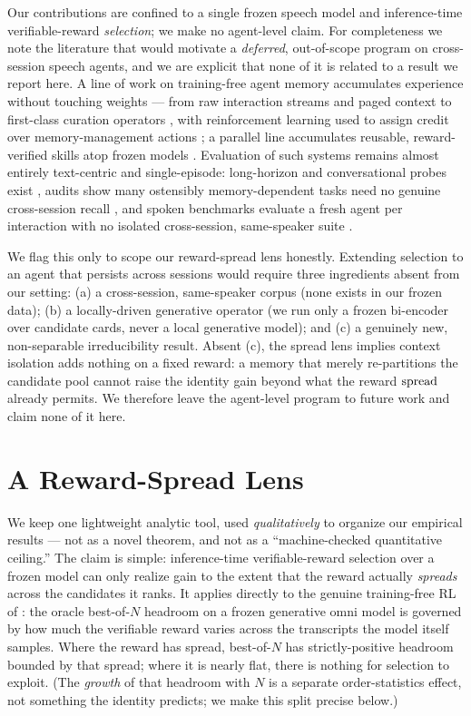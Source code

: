 Our contributions are confined to a single frozen speech model and inference-time verifiable-reward \emph{selection}; we make no agent-level claim. For completeness we note the literature that would motivate a \emph{deferred}, out-of-scope program on cross-session speech agents, and we are explicit that none of it is related to a result we report here. A line of work on training-free agent memory accumulates experience without touching weights --- from raw interaction streams and paged context \citep{genagents2023,memgpt2023} to first-class curation operators \citep{mem0_2025}, with reinforcement learning used to assign credit over memory-management actions \citep{memoryr1_2025}; a parallel line accumulates reusable, reward-verified skills atop frozen models \citep{voyager2023,sokskills2026}. Evaluation of such systems remains almost entirely text-centric and single-episode: long-horizon and conversational probes exist \citep{longmemeval2024,locomo2024}, audits show many ostensibly memory-dependent tasks need no genuine cross-session recall \citep{anatomymem2026}, and spoken benchmarks evaluate a fresh agent per interaction \citep{urobench2025,voicebench2024} with no isolated cross-session, same-speaker suite \citep{amber2026}.

We flag this only to scope our reward-spread lens honestly. Extending selection to an agent that persists across sessions would require three ingredients absent from our setting: (a) a cross-session, same-speaker corpus (none exists in our frozen data); (b) a locally-driven generative operator (we run only a frozen bi-encoder over candidate cards, never a local generative model); and (c) a genuinely new, non-separable irreducibility result. Absent (c), the spread lens implies context isolation adds nothing on a fixed reward: a memory that merely re-partitions the candidate pool cannot raise the identity gain beyond what the reward $\mathrm{spread}$ already permits. We therefore leave the agent-level program to future work and claim none of it here.

\section{A Reward-Spread Lens}
\label{sec:osa}

We keep one lightweight analytic tool, used \emph{qualitatively} to organize our empirical results
--- not as a novel theorem, and not as a ``machine-checked quantitative ceiling.'' The claim is
simple: inference-time verifiable-reward selection over a frozen model can only realize gain to the
extent that the reward actually \emph{spreads} across the candidates it ranks. It applies directly to
the genuine training-free RL of : the oracle best-of-$N$ headroom on a frozen generative
omni model is governed by how much the verifiable reward varies across the transcripts the model
itself samples. Where the reward has spread, best-of-$N$ has strictly-positive headroom bounded by that spread; where it
is nearly flat, there is nothing for selection to exploit. (The \emph{growth} of that headroom with $N$
is a separate order-statistics effect, not something the identity predicts; we make this split precise
below.)


